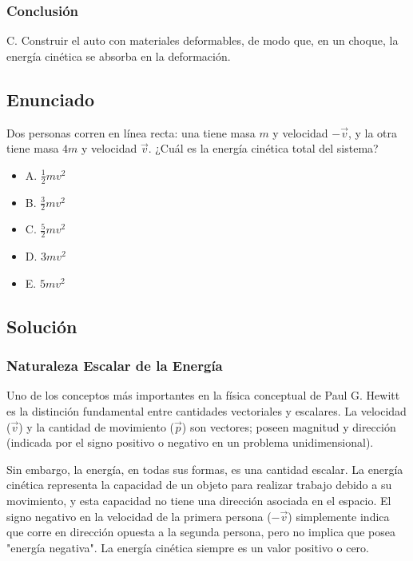 \documentclass[12pt, a4paper]{article}
\begin{document}
\subsubsection*{Conclusión}

C. Construir el auto con materiales deformables, de modo que, en un choque, la energía cinética se absorba en la deformación.

\newpage

\subsection*{Enunciado}

Dos personas corren en línea recta: una tiene masa $m$ y velocidad $-\vec{v}$, y la otra tiene masa $4m$ y velocidad $\vec{v}$. ¿Cuál es la energía cinética total del sistema?

\begin{itemize}
    \item A. $\frac{1}{2}mv^2$
    \item B. $\frac{3}{2}mv^2$
    \item C. $\frac{5}{2}mv^2$
    \item D. $3mv^2$
    \item E. $5mv^2$
\end{itemize}

\subsection*{Solución}

\subsubsection*{Naturaleza Escalar de la Energía}

Uno de los conceptos más importantes en la física conceptual de Paul G. Hewitt es la distinción fundamental entre cantidades vectoriales y escalares. La velocidad ($\vec{v}$) y la cantidad de movimiento ($\vec{p}$) son vectores; poseen magnitud y dirección (indicada por el signo positivo o negativo en un problema unidimensional). 

Sin embargo, la energía, en todas sus formas, es una cantidad escalar. La energía cinética representa la capacidad de un objeto para realizar trabajo debido a su movimiento, y esta capacidad no tiene una dirección asociada en el espacio. El signo negativo en la velocidad de la primera persona ($-\vec{v}$) simplemente indica que corre en dirección opuesta a la segunda persona, pero no implica que posea "energía negativa". La energía cinética siempre es un valor positivo o cero.
\end{document}
